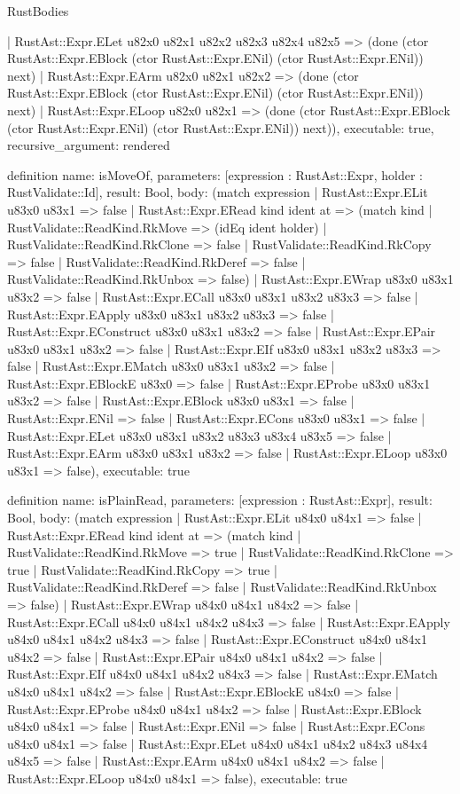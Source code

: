 \begin{lexlean}{RustBodies}
\begin{semanticmodule}
{    | RustAst::Expr.ELet u82x0 u82x1 u82x2 u82x3 u82x4 u82x5 => (done (ctor RustAst::Expr.EBlock (ctor RustAst::Expr.ENil) (ctor RustAst::Expr.ENil)) next)
    | RustAst::Expr.EArm u82x0 u82x1 u82x2 => (done (ctor RustAst::Expr.EBlock (ctor RustAst::Expr.ENil) (ctor RustAst::Expr.ENil)) next)
    | RustAst::Expr.ELoop u82x0 u82x1 => (done (ctor RustAst::Expr.EBlock (ctor RustAst::Expr.ENil) (ctor RustAst::Expr.ENil)) next)),
  executable: true,
  recursive_argument: rendered
}

definition{
  name: isMoveOf,
  parameters: [expression : RustAst::Expr, holder : RustValidate::Id],
  result: Bool,
  body: (match expression
    | RustAst::Expr.ELit u83x0 u83x1 => false
    | RustAst::Expr.ERead kind ident at => (match kind
      | RustValidate::ReadKind.RkMove => (idEq ident holder)
      | RustValidate::ReadKind.RkClone => false
      | RustValidate::ReadKind.RkCopy => false
      | RustValidate::ReadKind.RkDeref => false
      | RustValidate::ReadKind.RkUnbox => false)
    | RustAst::Expr.EWrap u83x0 u83x1 u83x2 => false
    | RustAst::Expr.ECall u83x0 u83x1 u83x2 u83x3 => false
    | RustAst::Expr.EApply u83x0 u83x1 u83x2 u83x3 => false
    | RustAst::Expr.EConstruct u83x0 u83x1 u83x2 => false
    | RustAst::Expr.EPair u83x0 u83x1 u83x2 => false
    | RustAst::Expr.EIf u83x0 u83x1 u83x2 u83x3 => false
    | RustAst::Expr.EMatch u83x0 u83x1 u83x2 => false
    | RustAst::Expr.EBlockE u83x0 => false
    | RustAst::Expr.EProbe u83x0 u83x1 u83x2 => false
    | RustAst::Expr.EBlock u83x0 u83x1 => false
    | RustAst::Expr.ENil => false
    | RustAst::Expr.ECons u83x0 u83x1 => false
    | RustAst::Expr.ELet u83x0 u83x1 u83x2 u83x3 u83x4 u83x5 => false
    | RustAst::Expr.EArm u83x0 u83x1 u83x2 => false
    | RustAst::Expr.ELoop u83x0 u83x1 => false),
  executable: true
}

definition{
  name: isPlainRead,
  parameters: [expression : RustAst::Expr],
  result: Bool,
  body: (match expression
    | RustAst::Expr.ELit u84x0 u84x1 => false
    | RustAst::Expr.ERead kind ident at => (match kind
      | RustValidate::ReadKind.RkMove => true
      | RustValidate::ReadKind.RkClone => true
      | RustValidate::ReadKind.RkCopy => true
      | RustValidate::ReadKind.RkDeref => false
      | RustValidate::ReadKind.RkUnbox => false)
    | RustAst::Expr.EWrap u84x0 u84x1 u84x2 => false
    | RustAst::Expr.ECall u84x0 u84x1 u84x2 u84x3 => false
    | RustAst::Expr.EApply u84x0 u84x1 u84x2 u84x3 => false
    | RustAst::Expr.EConstruct u84x0 u84x1 u84x2 => false
    | RustAst::Expr.EPair u84x0 u84x1 u84x2 => false
    | RustAst::Expr.EIf u84x0 u84x1 u84x2 u84x3 => false
    | RustAst::Expr.EMatch u84x0 u84x1 u84x2 => false
    | RustAst::Expr.EBlockE u84x0 => false
    | RustAst::Expr.EProbe u84x0 u84x1 u84x2 => false
    | RustAst::Expr.EBlock u84x0 u84x1 => false
    | RustAst::Expr.ENil => false
    | RustAst::Expr.ECons u84x0 u84x1 => false
    | RustAst::Expr.ELet u84x0 u84x1 u84x2 u84x3 u84x4 u84x5 => false
    | RustAst::Expr.EArm u84x0 u84x1 u84x2 => false
    | RustAst::Expr.ELoop u84x0 u84x1 => false),
  executable: true
}


\end{semanticmodule}
\end{lexlean}
